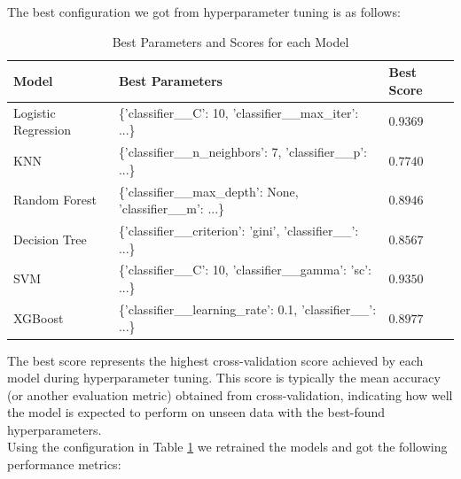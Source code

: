 \documentclass[12pt]{report}
\begin{document}
\noindent The best configuration we got from hyperparameter tuning is as follows:
\begin{table}[H]
    \centering
    \begin{tabular}{p{3cm}p{8cm}p{1.5cm}}
    \toprule
    \textbf{Model} & \textbf{Best Parameters} & \textbf{Best Score} \\
    \toprule
    Logistic Regression & \{'classifier\_\_C': 10, 'classifier\_\_max\_iter': ...\} & $0.9369$ \\
    \midrule
    KNN & \{'classifier\_\_n\_neighbors': 7, 'classifier\_\_p': ...\} & $0.7740$ \\
    \midrule
    Random Forest & \{'classifier\_\_max\_depth': None, 'classifier\_\_m': ...\} & $0.8946$ \\
    \midrule
    Decision Tree & \{'classifier\_\_criterion': 'gini', 'classifier\_\_': ...\} & $0.8567$ \\
    \midrule
    SVM & \{'classifier\_\_C': 10, 'classifier\_\_gamma': 'sc': ...\} & $0.9350$ \\
    \midrule
    XGBoost & \{'classifier\_\_learning\_rate': 0.1, 'classifier\_\_': ...\} & $0.8977$ \\
    \toprule
    \end{tabular}
    \caption{Best Parameters and Scores for each Model}
		\label{tab:best_params_scores}
\end{table}
The best score represents the highest cross-validation score achieved by each model during hyperparameter tuning. This score is typically the mean accuracy (or another evaluation metric) obtained from cross-validation, indicating how well the model is expected to perform on unseen data with the best-found hyperparameters. \\
Using the configuration in Table \ref{tab:best_params_scores} we retrained the models and got the following performance metrics:
\end{document}
